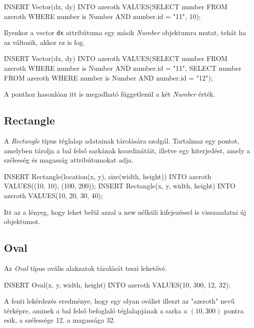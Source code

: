 \begin{sql}
INSERT Vector(dx, dy) INTO azeroth VALUES(SELECT number FROM
azeroth WHERE number is Number AND number.id = "11", 10);
\end{sql}

Ilyenkor a vector \texttt{dx} attribútuma egy másik \textit{Number} objektumra mutat, tehát ha az változik, akkor ez is fog.

\begin{sql}
INSERT Vector(dx, dy) INTO azeroth VALUES(SELECT number
FROM azeroth WHERE number is Number AND number.id = "11",
    SELECT number FROM azeroth
    WHERE number is Number AND number.id = "12");
\end{sql}

A ponthoz hasonlóan itt is megadható függetlenül a két \textit{Number} érték.


\subsection{Rectangle}

A \textit{Rectangle} típus téglalap adatainak tárolására szolgál. Tartalmaz egy pontot, amelyben tárolja a bal felső sarkának koordinátáit, illetve egy kiterjedést, amely a szélesség és magasság attribútumokat adja.

\begin{sql}
INSERT Rectangle(location(x, y), size(width, height)) INTO
azeroth VALUES((10, 10), (100, 200));
INSERT Rectangle(x, y, width, height) INTO azeroth VALUES(10, 20, 30, 40);
\end{sql}

Itt az a lényeg, hogy lehet belül azzal a new nélküli kifejezéssel is visszaadatni új objektumot.

\subsection{Oval}

Az \textit{Oval} típus ovális alakzatok tárolását teszi lehetővé. 

\begin{sql}
INSERT Oval(x, y, width, height) INTO azeroth 
VALUES(10, 300, 12, 32);
\end{sql}

A fenti lekérdezés eredménye, hogy egy olyan oválist illeszt az "azeroth" nevű térképre, aminek a bal felső befoglaló téglalapjának a sarka a $(10, 300)$ pontra esik, a szélessége 12, a magassága 32. 

